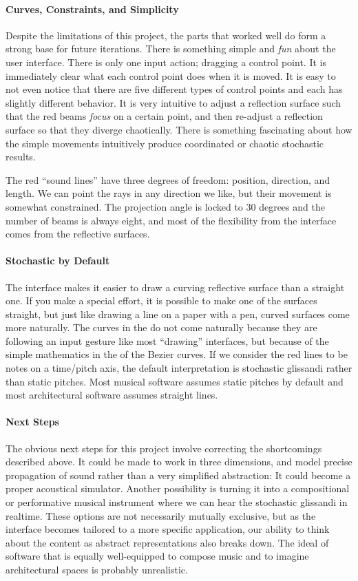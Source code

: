 \paragraph{Curves, Constraints, and Simplicity} Despite the
limitations of this project, the parts that worked well do form a
strong base for future iterations. There is something simple and
\textit{fun} about the user interface. There is only one input action;
dragging a control point. It is immediately clear what each control
point does when it is moved. It is easy to not even notice that there
are five different types of control points and each has slightly
different behavior. It is very intuitive to adjust a reflection
surface such that the red beams \textit{focus} on a certain point, and
then re-adjust a reflection surface so that they diverge
chaotically. There is something fascinating about how the simple
movements intuitively produce coordinated or chaotic stochastic
results.

The red ``sound lines'' have three degrees of freedom: position,
direction, and length. We can point the rays in any direction we like,
but their movement is somewhat constrained.  The projection angle is
locked to 30 degrees and the number of beams is always eight, and
most of the flexibility from the interface comes from the reflective
surfaces.

\paragraph{Stochastic by Default} The  interface makes it easier
to draw a curving reflective surface than a straight one. If you make
a special effort, it is possible to make one of the surfaces straight,
but just like drawing a line on a paper with a pen, curved surfaces
come more naturally. The curves in the  do not come naturally
because they are following an input gesture like most ``drawing''
interfaces, but because of the simple mathematics in the of the Bezier
curves. If we consider the red lines to be notes on a time/pitch axis,
the default interpretation is stochastic glissandi rather than static
pitches. Most musical software assumes static pitches by default and
most architectural software assumes straight lines.

\paragraph{Next Steps}
The obvious next steps for this project involve correcting the
shortcomings described above. It could be made to work in three
dimensions, and model precise propagation of sound rather than a very
simplified abstraction: It could become a proper acoustical
simulator. Another possibility is turning it into a compositional or
performative musical instrument where we can hear the stochastic
glissandi in realtime. These options are not necessarily mutually
exclusive, but as the interface becomes tailored to a more specific
application, our ability to think about the content as abstract
representations also breaks down. The ideal of software that is
equally well-equipped to compose music and to imagine architectural
spaces is probably unrealistic. 

